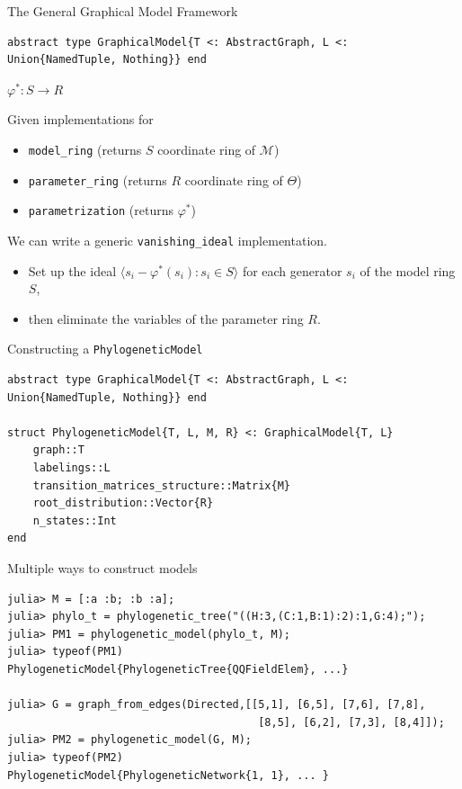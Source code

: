 \documentclass[9pt]{beamer}
\newcommand{\cm}{\mathcal{M}}
\begin{document}
\begin{frame}[fragile]{The General Graphical Model Framework}
\begin{verbatim}
abstract type GraphicalModel{T <: AbstractGraph, L <: Union{NamedTuple, Nothing}} end
\end{verbatim}
  \pause
  \begin{center}
    \Large $\varphi^{*} : S \to R$
  \end{center}
  Given implementations for

  \begin{itemize}
  \item \texttt{model\_ring} (returns  $S$ coordinate ring of $\cm$)
  \item \texttt{parameter\_ring} (returns $R$ coordinate ring of $\Theta$)
  \item \texttt{parametrization} (returns $\varphi^{*}$)
  \end{itemize}
  \vspace{2em}
  We can write a generic \texttt{vanishing\_ideal} implementation. \pause
  \begin{itemize}
  \item Set up the ideal $\langle s_i - \varphi^{*}(s_i) : s_i \in S \rangle$ for each generator $s_i$ of the model ring $S$,
  \item then eliminate the variables of the parameter ring $R$.
  \end{itemize}

\end{frame}

\begin{frame}[fragile]{Constructing a \texttt{PhylogeneticModel}}
\begin{verbatim}
abstract type GraphicalModel{T <: AbstractGraph, L <: Union{NamedTuple, Nothing}} end

struct PhylogeneticModel{T, L, M, R} <: GraphicalModel{T, L}
    graph::T
    labelings::L
    transition_matrices_structure::Matrix{M}
    root_distribution::Vector{R}
    n_states::Int
end
\end{verbatim}
  \pause
Multiple ways to construct models
\begin{verbatim}
julia> M = [:a :b; :b :a];
julia> phylo_t = phylogenetic_tree("((H:3,(C:1,B:1):2):1,G:4);");
julia> PM1 = phylogenetic_model(phylo_t, M);
julia> typeof(PM1)
PhylogeneticModel{PhylogeneticTree{QQFieldElem}, ...}

julia> G = graph_from_edges(Directed,[[5,1], [6,5], [7,6], [7,8],
                                       [8,5], [6,2], [7,3], [8,4]]);
julia> PM2 = phylogenetic_model(G, M);
julia> typeof(PM2)
PhylogeneticModel{PhylogeneticNetwork{1, 1}, ... }
\end{verbatim}

\end{frame}
\end{document}
